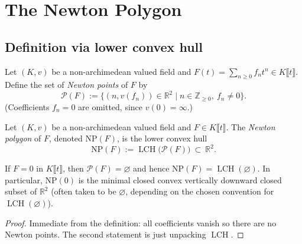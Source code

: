 \section{The Newton Polygon}

\subsection{Definition via lower convex hull}

\begin{definition}
  \label{def:newton_points}
  
  \leanok
  
  
  Let $(K,v)$ be a non-archimedean valued field and $F(t)=\sum_{n\ge 0} f_n t^n\in K\llbracket t\rrbracket$.
  Define the set of \emph{Newton points} of $F$ by
  \[
    \mathcal{P}(F) := \{(n, v(f_n)) \in \mathbb{R}^2 \mid n\in\mathbb{Z}_{\ge 0},\ f_n\neq 0\}.
  \]
  (Coefficients $f_n=0$ are omitted, since $v(0)=\infty$.)
\end{definition}

\begin{definition}
  \label{def:newton_polygon}
  
  \leanok
  
  
  Let $(K,v)$ be a non-archimedean valued field and $F\in K\llbracket t\rrbracket$.
  The \emph{Newton polygon} of $F$, denoted $\mathrm{NP}(F)$, is the lower convex hull
  \[
    \mathrm{NP}(F) := \operatorname{LCH}\big(\mathcal{P}(F)\big)\ \subset\ \mathbb{R}^2.
  \]
\end{definition}

\begin{lemma}
  \label{lem:newton_polygon_zero}
  
  \leanok
  If $F=0$ in $K\llbracket t\rrbracket$, then $\mathcal{P}(F)=\varnothing$ and hence $\mathrm{NP}(F)=\operatorname{LCH}(\varnothing)$.
  In particular, $\mathrm{NP}(0)$ is the minimal closed convex vertically downward closed subset of $\mathbb{R}^2$
  (often taken to be $\varnothing$, depending on the chosen convention for $\operatorname{LCH}(\varnothing)$).
\end{lemma}

\begin{proof}
 
  \leanok
  Immediate from the definition: all coefficients vanish so there are no Newton points.
  The second statement is just unpacking $\operatorname{LCH}$.
\end{proof}

